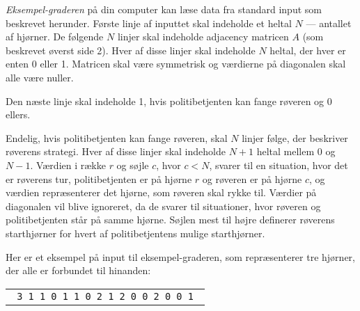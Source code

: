 \documentclass{boi2014-dk}
\begin{document}
    \Experimentation
    {\em Eksempel-graderen} på din computer kan læse data fra standard input
    som beskrevet herunder.
    Første linje af inputtet skal indeholde et heltal $N$ --- antallet af
    hjørner. De følgende $N$ linjer skal indeholde adjacency matricen $A$ (som
    beskrevet øverst side 2). Hver af disse linjer skal indeholde $N$ heltal,
    der hver er enten 0 eller 1. Matricen skal være symmetrisk og værdierne på
    diagonalen skal alle være nuller.

    Den næste linje skal indeholde 1, hvis politibetjenten kan fange røveren
    og 0 ellers.

    Endelig, hvis politibetjenten kan fange røveren, skal $N$ linjer følge,
    der beskriver røverens strategi. Hver af disse linjer skal indeholde
    $N+1$ heltal mellem $0$ og $N-1$. Værdien i række $r$ og søjle $c$,
    hvor $c < N$, svarer til en situation, hvor det er røverens tur,
    politibetjenten er på hjørne $r$ og røveren er på hjørne $c$, og værdien
    repræsenterer det hjørne, som røveren skal rykke til. Værdier på
    diagonalen vil blive ignoreret, da de svarer til situationer, hvor
    røveren og politibetjenten står på samme hjørne. Søjlen mest til højre
    definerer røverens starthjørner for hvert af politibetjentens mulige
    starthjørner.

    Her er et eksempel på input til eksempel-graderen, som repræsenterer tre
    hjørner, der alle er forbundet til hinanden:

    \begin{center}
        \begin{tabular}{p{4cm}}
            {\tt
                3 \newline
                0 1 1 \newline
                1 0 1 \newline
                1 1 0 \newline
                1 \newline
                0 2 1 2 \newline
                2 0 0 2 \newline
                1 0 0 1 \newline
            }
        \end{tabular}
    \end{center}
\end{document}
